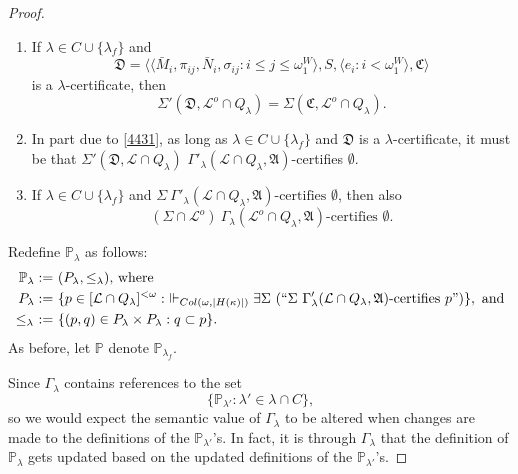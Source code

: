 \documentclass[12pt]{article}
\numberwithin{equation}{section}
\begin{document}
\begin{proof}
\begin{rem}\label{rem443}
\leavevmode
\begin{enumerate}[label=(\arabic*)]
    \item\label{443'1} If $\lambda \in C \cup \{\lambda_f\}$ and
    \begin{equation*}
        \mathfrak{D} = \langle \langle \bar{M}_i, \pi_{ij},  \bar{N}_i, \sigma_{ij} : i \leq j \leq \omega_1^{W} \rangle, S, \langle e_i : i < \omega_1^W \rangle, \mathfrak{C} \rangle
    \end{equation*}
    is a $\lambda$-certificate, then
    \begin{equation*}
        \Sigma'(\mathfrak{D}, \mathcal{L}^o \cap Q_{\lambda}) = \Sigma(\mathfrak{C}, \mathcal{L}^o \cap Q_{\lambda}) \text{.}
    \end{equation*}
    \item\label{443'2} In part due to \ref{4431}, as long as $\lambda \in C \cup \{\lambda_f\}$ and $\mathfrak{D}$ is a $\lambda$-certificate, it must be that $\Sigma'(\mathfrak{D}, \mathcal{L} \cap Q_{\lambda})$ $\Gamma'_{\lambda} (\mathcal{L} \cap Q_{\lambda}, \mathfrak{A})$-certifies $\emptyset$.
    \item\label{443'3} If $\lambda \in C \cup \{\lambda_f\}$ and $\Sigma \ \Gamma'_{\lambda} (\mathcal{L} \cap Q_{\lambda}, \mathfrak{A}) \text{-certifies } \emptyset$, then also
    \begin{equation*}
        (\Sigma \cap \mathcal{L}^o) \ \Gamma_{\lambda} (\mathcal{L}^o \cap Q_{\lambda}, \mathfrak{A}) \text{-certifies } \emptyset \text{.}
    \end{equation*}
\end{enumerate}
\end{rem}

Redefine $\mathbb{P}_{\lambda}$ as follows:
\begin{align*}
    \mathbb{P}_{\lambda} := \ & (P_{\lambda}, \leq_{\lambda}) \text{, where } \\
    P_{\lambda} := \ & \{p \in [\mathcal{L} \cap Q_{\lambda}]^{< \omega} : \ \Vdash_{Col(\omega, |H(\kappa)|)} \exists \Sigma \ (``\Sigma \ \Gamma'_{\lambda} (\mathcal{L} \cap Q_{\lambda}, \mathfrak{A}) \text{-certifies } p")\}, \text{ and} \\
    \leq_{\lambda} \ := \ & \{(p, q) \in P_{\lambda} \times P_{\lambda} : q \subset p\}.
\end{align*}
As before, let $\mathbb{P}$ denote $\mathbb{P}_{\lambda_f}$. 

Since $\Gamma_{\lambda}$ contains references to the set 
\begin{equation*}
    \{\mathbb{P}_{\lambda'} : \lambda' \in \lambda \cap C\} \text{,}
\end{equation*}
so we would expect the semantic value of $\Gamma_{\lambda}$ to be altered when changes are made to the definitions of the $\mathbb{P}_{\lambda'}$'s. In fact, it is through $\Gamma_{\lambda}$ that the definition of $\mathbb{P}_{\lambda}$ gets updated based on the updated definitions of the $\mathbb{P}_{\lambda'}$'s.


\end{proof}
\end{document}
